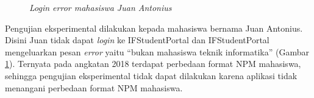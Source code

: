 \begin{itemize}
\begin{itemize}
\begin{figure}[H]
			\caption{\textit{Login error mahasiswa Juan Antonius}}
			\label{fig:2018_1_error}
		\end{figure}
		Pengujian eksperimental dilakukan kepada mahasiswa bernama Juan Antonius. Disini Juan tidak dapat \textit{login} ke IFStudentPortal dan IFStudentPortal mengeluarkan pesan \textit{error} yaitu ``bukan mahasiswa teknik informatika'' (Gambar \ref{fig:2018_1_error}). Ternyata pada angkatan 2018 terdapat perbedaan format NPM mahasiswa, sehingga pengujian eksperimental tidak dapat dilakukan karena aplikasi tidak menangani perbedaan format NPM mahasiswa.
	\end{itemize}
\end{itemize}